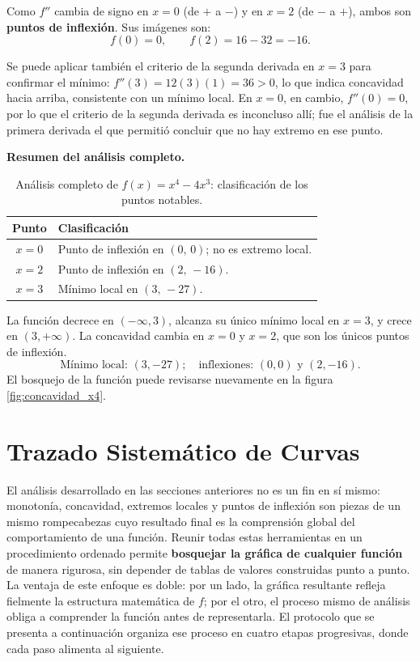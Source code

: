 \begin{example}[Análisis completo de $f(x)=x^4-4x^3$]
\begin{myproof}
Como $f''$ cambia de signo en $x=0$ (de $+$ a $-$) y en $x=2$ (de $-$
a $+$), ambos son \textbf{puntos de inflexión}. Sus imágenes son:
\[
f(0) = 0, \qquad f(2) = 16 - 32 = -16.
\]

Se puede aplicar también el criterio de la segunda derivada en $x=3$
para confirmar el mínimo: $f''(3)=12(3)(1)=36>0$, lo que indica
concavidad hacia arriba, consistente con un mínimo local. En $x=0$,
en cambio, $f''(0)=0$, por lo que el criterio de la segunda derivada
es inconcluso allí; fue el análisis de la primera derivada el que
permitió concluir que no hay extremo en ese punto.

\textbf{Resumen del análisis completo.}

\begin{table}[H]
\centering
\begin{tabular}{c l}
\toprule
Punto & Clasificación \\
\midrule
$x=0$ & Punto de inflexión en $(0,\,0)$; no es extremo local. \\
$x=2$ & Punto de inflexión en $(2,\,-16)$. \\
$x=3$ & Mínimo local en $(3,\,-27)$. \\
\bottomrule
\end{tabular}
\caption{Análisis completo de $f(x)=x^4-4x^3$: clasificación de los puntos notables.}
\end{table}

La función decrece en $(-\infty,3)$, alcanza su único mínimo local en
$x=3$, y crece en $(3,+\infty)$. La concavidad cambia en $x=0$ y
$x=2$, que son los únicos puntos de inflexión.
\[
\boxed{\text{Mínimo local: }(3,-27);\quad\text{inflexiones: }(0,0)\text{ y }(2,-16).}
\]
El bosquejo de la función puede revisarse nuevamente en la figura \ref{fig:concavidad_x4}.
\end{myproof}
\end{example}

\section{Trazado Sistemático de Curvas}

El análisis desarrollado en las secciones anteriores no es un fin en sí
mismo: monotonía, concavidad, extremos locales y puntos de inflexión son
piezas de un mismo rompecabezas cuyo resultado final es la comprensión
global del comportamiento de una función. Reunir todas estas herramientas
en un procedimiento ordenado permite \textbf{bosquejar la gráfica de
cualquier función} de manera rigurosa, sin depender de tablas de valores
construidas punto a punto. La ventaja de este enfoque es doble: por un
lado, la gráfica resultante refleja fielmente la estructura matemática de
$f$; por el otro, el proceso mismo de análisis obliga a comprender la
función antes de representarla. El protocolo que se presenta a
continuación organiza ese proceso en cuatro etapas progresivas, donde
cada paso alimenta al siguiente.

